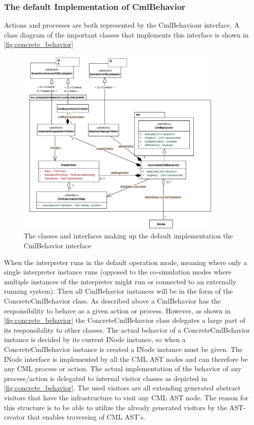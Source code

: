 \documentclass[a4paper, 10pt]{include/compassreport}   %
\begin{document}
\subsubsection{The default Implementation of CmlBehavior}
\label{sec:action_process_structure}
Actions and processes are both represented by the CmlBehaviour
interface. A class diagram of the important classes that implements
this interface is shown in \autoref{fig:concrete_behavior}
\begin{figure}[ht!]
  \begin{center}
    \includegraphics[width=0.9\textwidth]{figures/defaultCmlBehaviorImpl}
    \caption{The classes and interfaces making up the default implementation the CmlBehavior interface}
    \label{fig:concrete_behavior}
  \end{center}
\end{figure}
When the interpreter runs in the default operation mode, meaning where
only a single interpreter instance runs (opposed to the co-simulation
modes where multiple instances of the interpreter might run or
connected to an externally running system). Then all CmlBehavior
instances will be in the form of the ConcreteCmlBehavior class. As
described above a CmlBehavior has the responsibility to behave as a
given action or process. However, as shown in
\autoref{fig:concrete_behavior} the ConcreteCmlBehavior class
delegates a large part of its responsibility to other classes. The
actual behavior of a ConcreteCmlBehavior instance is decided by its
current INode instance, so when a ConcreteCmlBehavior instance is
created a INode instance must be given. The INode interface is
implemented by all the CML AST nodes and can therefore be any CML
process or action.  The actual implementation of the behavior of any
process/action is delegated to internal visitor classes as depicted in
\autoref{fig:concrete_behavior}. The used visitors are all extending
generated abstract visitors that have the infrastructure to visit any
CML AST node. The reason for this structure is to be able to utilize
the already generated visitors by the AST-creator \cite{} that enables
traversing of CML AST's.
\end{document}
